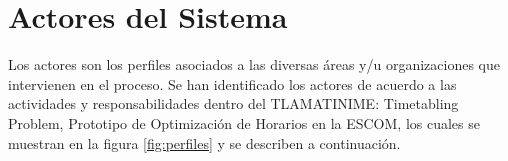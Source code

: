 	

\section{Actores del Sistema} \label{sec:Comportamiento:ActoresSistema}

Los actores son los perfiles asociados a las diversas áreas y/u organizaciones que intervienen en el proceso. Se han identificado los actores de acuerdo a las actividades y responsabilidades dentro del TLAMATINIME: Timetabling Problem, Prototipo de Optimización de Horarios en la ESCOM, los cuales se muestran en la figura \ref{fig:perfiles} y se describen a continuación.


